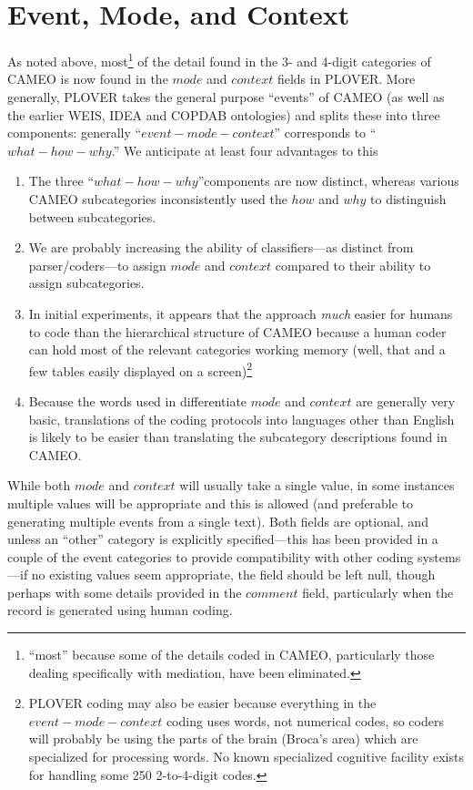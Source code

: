 \documentclass[11pt]{report}
\newcommand{\fn}[1]{\footnote{#1}}
\begin{document}
\section{Event, Mode, and Context}\label{ssec:ecm}

As noted above, most\fn{``most'' because some of the details coded in CAMEO, particularly those dealing specifically with mediation, have been eliminated.} of the detail found in the 3- and 4-digit categories of CAMEO is now found in the $mode$ and  $context$ fields in PLOVER. More generally, PLOVER takes the general purpose ``events'' of CAMEO (as well as the earlier WEIS, IDEA and COPDAB ontologies) and splits these into three components: generally ``$event-mode-context$'' corresponds to ``$what-how-why$.'' We anticipate at least four advantages to this
\begin{enumerate}
\item The three ``$what-how-why$''components are now distinct, whereas various CAMEO subcategories inconsistently used the $how$ and $why$ to distinguish between subcategories.
\item We are probably increasing the ability of classifiers---as distinct from parser/coders---to assign $mode$ and $context$ compared to their ability to assign subcategories.
\item In initial experiments, it appears that the  approach \textit{much} easier for humans to code than the hierarchical structure of CAMEO because a human coder can hold most of the relevant categories working memory (well, that and a few tables easily displayed on a screen)\footnote{PLOVER coding may also be easier because everything in the $event-mode-context$ coding uses words, not numerical codes, so coders will probably be using the parts of the brain (Broca's area) which are specialized for processing words. No known specialized cognitive facility exists for handling some 250 2-to-4-digit codes.}
\item Because the words used in differentiate $mode$ and $context$ are generally very basic, translations of the coding protocols into languages other than English is likely to be easier than translating the subcategory descriptions found in CAMEO. 
\end{enumerate}

While both $mode$ and $context$ will usually take a single value, in some instances multiple values will be appropriate and this is allowed (and preferable to generating multiple events from a single text). Both fields are optional, and unless an ``other'' category is explicitly specified---this has been provided in a couple of the event categories to provide compatibility with other coding systems---if no existing values seem appropriate, the field should be left null, though perhaps with some details provided in the $comment$ field, particularly when the record is generated using human coding.
\end{document}
